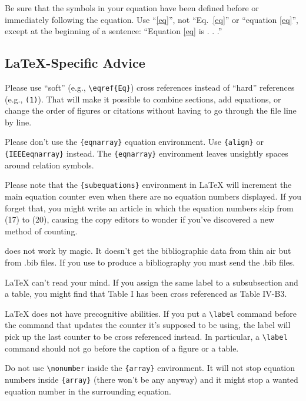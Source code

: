 \documentclass[conference]{IEEEtran}
\begin{document}
Be sure that the 
symbols in your equation have been defined before or immediately following 
the equation. Use ``\eqref{eq}'', not ``Eq.~\eqref{eq}'' or ``equation \eqref{eq}'', except at 
the beginning of a sentence: ``Equation \eqref{eq} is . . .''

\subsection{\LaTeX-Specific Advice}

Please use ``soft'' (e.g., \verb|\eqref{Eq}|) cross references instead
of ``hard'' references (e.g., \verb|(1)|). That will make it possible
to combine sections, add equations, or change the order of figures or
citations without having to go through the file line by line.

Please don't use the \verb|{eqnarray}| equation environment. Use
\verb|{align}| or \verb|{IEEEeqnarray}| instead. The \verb|{eqnarray}|
environment leaves unsightly spaces around relation symbols.

Please note that the \verb|{subequations}| environment in {\LaTeX}
will increment the main equation counter even when there are no
equation numbers displayed. If you forget that, you might write an
article in which the equation numbers skip from (17) to (20), causing
the copy editors to wonder if you've discovered a new method of
counting.

{\BibTeX} does not work by magic. It doesn't get the bibliographic
data from thin air but from .bib files. If you use {\BibTeX} to produce a
bibliography you must send the .bib files. 

{\LaTeX} can't read your mind. If you assign the same label to a
subsubsection and a table, you might find that Table I has been cross
referenced as Table IV-B3. 

{\LaTeX} does not have precognitive abilities. If you put a
\verb|\label| command before the command that updates the counter it's
supposed to be using, the label will pick up the last counter to be
cross referenced instead. In particular, a \verb|\label| command
should not go before the caption of a figure or a table.

Do not use \verb|\nonumber| inside the \verb|{array}| environment. It
will not stop equation numbers inside \verb|{array}| (there won't be
any anyway) and it might stop a wanted equation number in the
surrounding equation.
\end{document}
